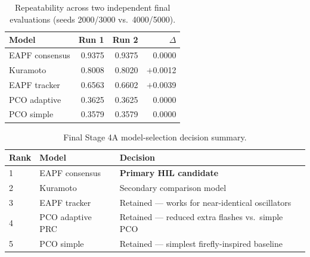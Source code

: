 \begin{table}[htbp]
\centering
\caption{Repeatability across two independent final evaluations (seeds
         2000/3000 vs.\ 4000/5000).}
\label{tab:repeatability}
\begin{tabular}{@{}lrrr@{}}
\toprule
\textbf{Model} & \textbf{Run 1} & \textbf{Run 2} & \textbf{$\Delta$} \\
\midrule
EAPF consensus & 0.9375 & 0.9375 & 0.0000 \\
Kuramoto       & 0.8008 & 0.8020 & $+$0.0012 \\
EAPF tracker   & 0.6563 & 0.6602 & $+$0.0039 \\
PCO adaptive   & 0.3625 & 0.3625 & 0.0000 \\
PCO simple     & 0.3579 & 0.3579 & 0.0000 \\
\bottomrule
\end{tabular}
\end{table}

\begin{table}[htbp]
\centering
\caption{Final Stage 4A model-selection decision summary.}
\label{tab:decision}
\begin{tabular}{@{}llp{6.5cm}@{}}
\toprule
\textbf{Rank} & \textbf{Model} & \textbf{Decision} \\
\midrule
1 & EAPF consensus & \textbf{Primary HIL candidate} \\
2 & Kuramoto & Secondary comparison model \\
3 & EAPF tracker & Retained — works for near-identical oscillators \\
4 & PCO adaptive PRC & Retained — reduced extra flashes vs.\ simple PCO \\
5 & PCO simple & Retained — simplest firefly-inspired baseline \\
\bottomrule
\end{tabular}
\end{table}
